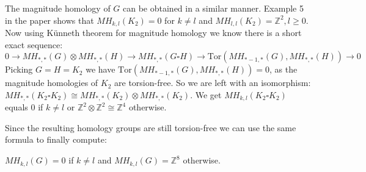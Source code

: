 \documentclass{article}
\begin{document}
The magnitude homology of $G$ can be obtained in a similar manner.
Example 5 in the paper shows that $MH_{k,l}(K_2) = 0$ for $k \neq l$ and 
$MH_{l,l}(K_2)= \mathbb{Z}^2, l \geq 0$.
Now using Künneth theorem for magnitude homology we know there is a short exact sequence:
\begin{equation*}
0 \to MH_{*,*}(G) \otimes MH_{*,*}(H) \to MH_{*,*}(G \square H) \to \mathrm{Tor}(MH_{*-1,*}(G),MH_{*,*}(H)) \to 0
\end{equation*}
Picking $G=H = K_2$ we have $\mathrm{Tor}(MH_{*-1,*}(G),MH_{*,*}(H)) = 0$, as the magnitude homologies of $K_2$ are torsion-free. So we are left with an isomorphism:
$MH_{*,*}(K_2 \square K_2) \cong MH_{*,*}(K_2) \otimes MH_{*,*}(K_2)$.
We get $MH_{k,l}(K_2 \square K_2)$ equals $0$ if $k \neq l$ or $\mathbb{Z}^2 \otimes \mathbb{Z}^2 \cong \mathbb{Z}^4$ otherwise.

Since the resulting homology groups are still torsion-free we can use the same formula to finally compute:

$MH_{k,l}(G) = 0$ if $k \neq l$ and $MH_{k,l}(G) = \mathbb{Z}^8$ otherwise.
\end{document}
